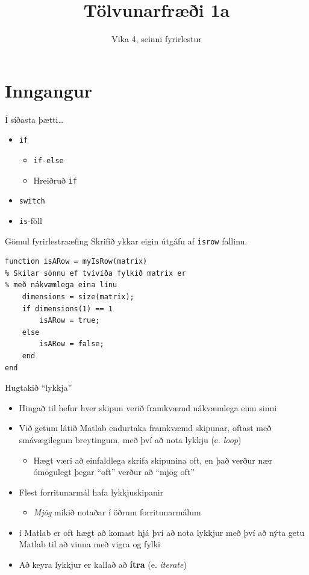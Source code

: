 \documentclass[handout]{beamer}
\title{Tölvunarfræði 1a}
\subtitle{Vika 4, seinni fyrirlestur}
\begin{document}
\begin{frame}
\titlepage
\end{frame}

\section{Inngangur}

\begin{frame}{Í síðasta þætti\ldots}
\begin{itemize}
    \item \texttt{if}
    \begin{itemize}
        \item \texttt{if-else}
        \item Hreiðruð \texttt{if}
    \end{itemize}
    \item \texttt{switch}
    \item \texttt{is}-föll
\end{itemize}
\end{frame}

\begin{frame}[fragile]{Gömul fyrirlestraæfing}
Skrifið ykkar eigin útgáfu af \texttt{isrow} fallinu. \pause
\begin{verbatim}
function isARow = myIsRow(matrix)
% Skilar sönnu ef tvívíða fylkið matrix er 
% með nákvæmlega eina línu
    dimensions = size(matrix);
    if dimensions(1) == 1
        isARow = true;
    else
        isARow = false;
    end
end
\end{verbatim}

\end{frame}

\begin{frame}{Hugtakið ``lykkja''}
\begin{itemize}
 \item Hingað til hefur hver skipun verið framkvæmd nákvæmlega einu sinni
 \item Við getum látið Matlab endurtaka framkvæmd skipunar, oftast með smávægilegum breytingum, með því að nota lykkju (e. \emph{loop})
 \begin{itemize}
  \item Hægt væri að einfaldlega skrifa skipunina oft, en það verður nær ómögulegt þegar ``oft'' verður að ``mjög oft''
 \end{itemize}
 \item Flest forritunarmál hafa lykkjuskipanir
 \begin{itemize}
  \item \emph{Mjög} mikið notaðar í öðrum forritunarmálum
 \end{itemize}
 \item í Matlab er oft hægt að komast hjá því að nota lykkjur með því að nýta getu Matlab til að vinna með vigra og fylki
 \item Að keyra lykkjur er kallað að \textbf{ítra} (e. \emph{iterate})
\end{itemize}
\end{frame}
\end{document}
